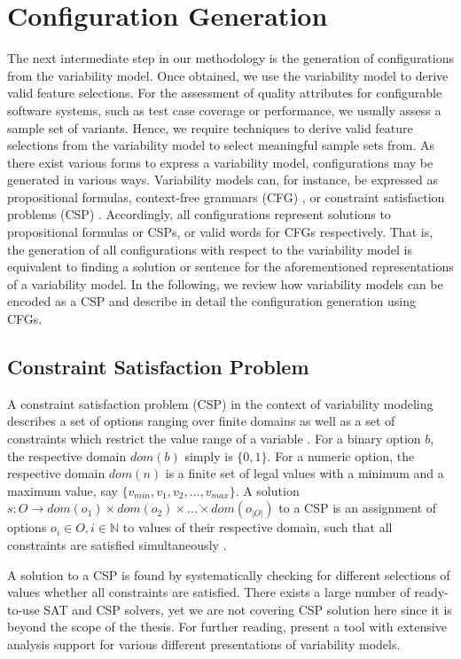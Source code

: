 \section{Configuration Generation}\label{sec:configuration_gen}
The next intermediate step in our methodology is the generation of
configurations from the variability model. Once obtained, we use the
variability model to derive valid feature selections. For the assessment of
quality attributes for configurable software systems, such as test case
coverage or performance, we usually assess a sample set of variants. Hence, we
require techniques to derive valid feature selections from the variability
model to select meaningful sample sets from. As there exist various forms to
express a variability model, configurations may be generated in various ways.
Variability models can, for instance, be expressed as propositional formulas,
context-free grammars (CFG) \citep{batory_feature_2005}, or constraint
satisfaction problems (CSP)
\citep{benavides_automated_2005,benavides_using_2005}. Accordingly, all configurations represent solutions to propositional formulas or CSPs, or valid words for CFGs
respectively. That is, the generation of all configurations with respect to the
variability model is equivalent to finding a solution or sentence for the
aforementioned representations of a variability model. In the following, we
review how variability models can be encoded as a CSP and describe in detail
the configuration generation using CFGs.

\subsection{Constraint Satisfaction Problem}
A constraint satisfaction problem (CSP) in the context of variability modeling
describes a set of options ranging over finite domains as well as a set of
constraints which restrict the value range of a variable
\citep{benavides_automated_2005}. For a binary option $b$, the respective domain $dom(b)$ simply is $\lbrace 0, 1\rbrace$.
For a numeric option, the respective domain $dom(n)$ is a finite set of legal
values with a minimum and a maximum value, say $\lbrace v_{min}, v_1,
v_2, \ldots, v_{max}\rbrace$.
A solution $s: O \rightarrow dom(o_1) \times dom(o_2) \times \ldots \times
dom(o_{|O|})$ to a CSP is an assignment of options $o_i \in O, i \in \mathbb{N}$
to values of their respective domain, such that all constraints are satisfied simultaneously \citep{benavides_automated_2005}.  

A solution to a CSP is found by systematically checking for different
selections of values whether all constraints are satisfied. There exists a
large number of ready-to-use SAT and CSP solvers, yet we are not covering CSP
solution here since it is beyond the scope of the thesis. For further reading, 
\citep{benavides_fama:_2007} present a tool with extensive analysis support for
various different presentations of variability models.

